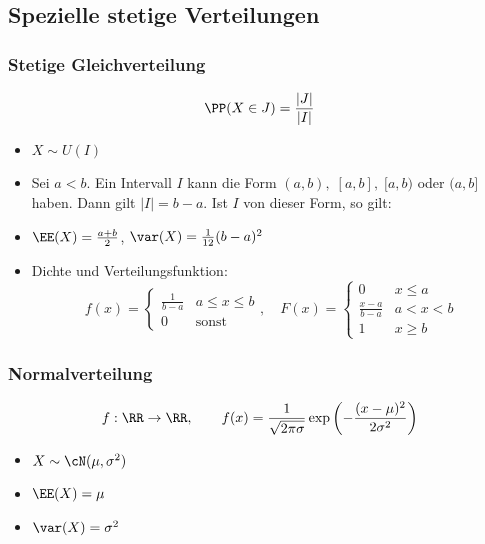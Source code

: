 \subsection{Spezielle stetige Verteilungen}

\subsubsection{Stetige Gleichverteilung}

$$\PP(X\in J)=\frac{|J|}{|I|}$$
\begin{itemize}
\item $X \sim U(I)$
\item Sei $a<b$. Ein Intervall $I$ kann die Form $(a,b),\;[a,b],\;[a,b)$ oder $(a,b]$ haben. Dann gilt $|I|=b-a$. Ist $I$ von dieser Form, so gilt:
\item $\EE(X)=\frac{a+b}{2}$, $\var(X)=\frac{1}{12}(b-a)^2$
\item Dichte und Verteilungsfunktion:
$$f(x)=\begin{cases}
\frac{1}{b-a} & a\leq x \leq b\\
0 & \mathrm{sonst}
\end{cases}, \quad F(x)=\begin{cases}
0 & x \leq a\\
\frac{x-a}{b-a} & a<x<b\\
1 & x \geq b
\end{cases}$$
\end{itemize}

\subsubsection{Normalverteilung}
$$f: \RR\to \RR, \qquad f(x)=\frac{1}{\sqrt{2\pi\sigma}}\exp\left(-\frac{(x-\mu)^2}{2\sigma^2}\right)$$

\begin{itemize}
\item $X\sim \cN(\mu, \sigma^2)$
\item $\EE(X)=\mu$
\item $\var(X) = \sigma^2$
\end{itemize}

